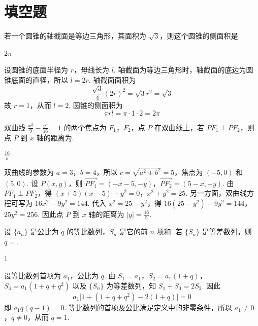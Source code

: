 \section{填空题}
\begin{problem}
若一个圆锥的轴截面是等边三角形，其面积为 \(\sqrt{3}\)，则这个圆锥的侧面积是\fillinblank{}.
\end{problem}

\begin{answer}
\(2\pi\)
\end{answer}

\begin{solution}
设圆锥的底面半径为 \(r\)，母线长为 \(l\). 轴截面为等边三角形时，轴截面的底边为圆锥底面的直径，所以 \(l=2r\). 轴截面面积为
\[
\frac{\sqrt3}{4}(2r)^2=\sqrt3r^2=\sqrt3
\]
故 \(r=1\)，从而 \(l=2\). 圆锥的侧面积为
\[
\pi rl=\pi\cdot1\cdot2=2\pi
\]
\end{solution}

\begin{problem}
双曲线 \(\frac{x^2}{9} - \frac{y^2}{16} = 1\) 的两个焦点为 \(F_{1}\)，\(F_{2}\)，点 \(P\) 在双曲线上，若 \(PF_{1} \perp PF_{2}\)，则点 \(P\) 到 \(x\) 轴的距离为\fillinblank{}.
\end{problem}

\begin{answer}
\(\frac{16}{5}\)
\end{answer}

\begin{solution}
双曲线的参数为 \(a=3\)，\(b=4\)，所以 \(c=\sqrt{a^2+b^2}=5\)，焦点为 \((-5,0)\) 和 \((5,0)\). 设 \(P(x,y)\)，则
\(\overrightarrow{PF_1}=(-x-5,-y)\)，\(\overrightarrow{PF_2}=(5-x,-y)\).
由 \(PF_1\perp PF_2\)，得
\((x+5)(x-5)+y^2=0\)，\(x^2+y^2=25\).
另一方面，双曲线方程可写为 \(16x^2-9y^2=144\). 代入 \(x^2=25-y^2\)，得
\(16(25-y^2)-9y^2=144\)，\(25y^2=256\).
因此点 \(P\) 到 \(x\) 轴的距离为 \(|y|=\frac{16}{5}\).
\end{solution}

\begin{problem}
设 \( \{a_{n}\} \) 是公比为 \(q\) 的等比数列，\( S_{n} \) 是它的前 \(n\) 项和. 若 \( \{S_{n}\} \) 是等差数列，则 \(q = \)\fillinblank{}.
\end{problem}

\begin{answer}
1
\end{answer}

\begin{solution}
设等比数列首项为 \(a_1\)，公比为 \(q\). 由
\(S_1=a_1\)，\(S_2=a_1(1+q)\)，\(S_3=a_1(1+q+q^2)\)
以及 \(\{S_n\}\) 为等差数列，知 \(S_1+S_3=2S_2\). 因此
\[
a_1\bigl[1+(1+q+q^2)-2(1+q)\bigr]=0
\]
即 \(a_1q(q-1)=0\). 等比数列的首项及公比满足定义中的非零条件，所以 \(a_1\ne0\)，\(q\ne0\)，从而 \(q=1\).
\end{solution}

